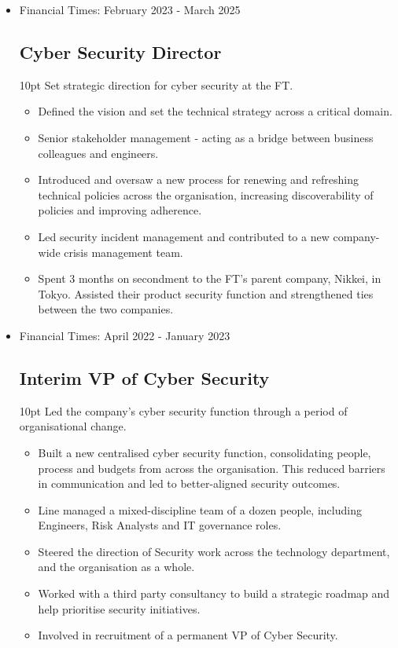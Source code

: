 \documentclass[a4paper]{article}
\newenvironment{detail}{\begin{adjustwidth}{10pt}{}}{\end{adjustwidth}}
\begin{document}
\begin{itemize}


\item Financial Times: February 2023 - March 2025
\subsection*{Cyber Security Director}
\begin{detail}
Set strategic direction for cyber security at the FT.

\begin{itemize}
	\item Defined the vision and set the technical strategy across a critical domain.
	\item Senior stakeholder management - acting as a bridge between business colleagues and engineers.
	\item Introduced and oversaw a new process for renewing and refreshing technical policies across the organisation, increasing discoverability of policies and improving adherence.
	\item Led security incident management and contributed to a new company-wide crisis management team.
	\item Spent 3 months on secondment to the FT's parent company, Nikkei, in Tokyo.  Assisted their product security function and strengthened ties between the two companies.
\end{itemize}
\end{detail}

\item Financial Times: April 2022 - January 2023
\subsection*{Interim VP of Cyber Security}
\begin{detail}
Led the company's cyber security function through a period of organisational change.

\begin{itemize}
	\item Built a new centralised cyber security function, consolidating people, process and budgets from across the organisation.  This reduced barriers in communication and led to better-aligned security outcomes.
	\item Line managed a mixed-discipline team of a dozen people, including Engineers, Risk Analysts and IT governance roles.
	\item Steered the direction of Security work across the technology department, and the organisation as a whole.
	\item Worked with a third party consultancy to build a strategic roadmap and help prioritise security initiatives.
	\item Involved in recruitment of a permanent VP of Cyber Security.
\end{itemize}
\end{detail}


\end{itemize}
\end{document}
